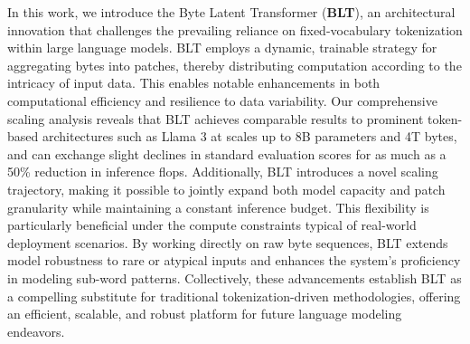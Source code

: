 In this work, we introduce the Byte Latent Transformer (\textbf{BLT}), an architectural innovation that challenges the prevailing reliance on fixed-vocabulary tokenization within large language models. {\textsc BLT} employs a dynamic, trainable strategy for aggregating bytes into patches, thereby distributing computation according to the intricacy of input data. This enables notable enhancements in both computational efficiency and resilience to data variability. Our comprehensive scaling analysis reveals that {\textsc BLT} achieves comparable results to prominent token-based architectures such as Llama 3 at scales up to 8B parameters and 4T bytes, and can exchange slight declines in standard evaluation scores for as much as a 50\% reduction in inference flops. Additionally, {\textsc BLT} introduces a novel scaling trajectory, making it possible to jointly expand both model capacity and patch granularity while maintaining a constant inference budget. This flexibility is particularly beneficial under the compute constraints typical of real-world deployment scenarios. By working directly on raw byte sequences, {\textsc BLT} extends model robustness to rare or atypical inputs and enhances the system’s proficiency in modeling sub-word patterns. Collectively, these advancements establish {\textsc BLT} as a compelling substitute for traditional tokenization-driven methodologies, offering an efficient, scalable, and robust platform for future language modeling endeavors.

